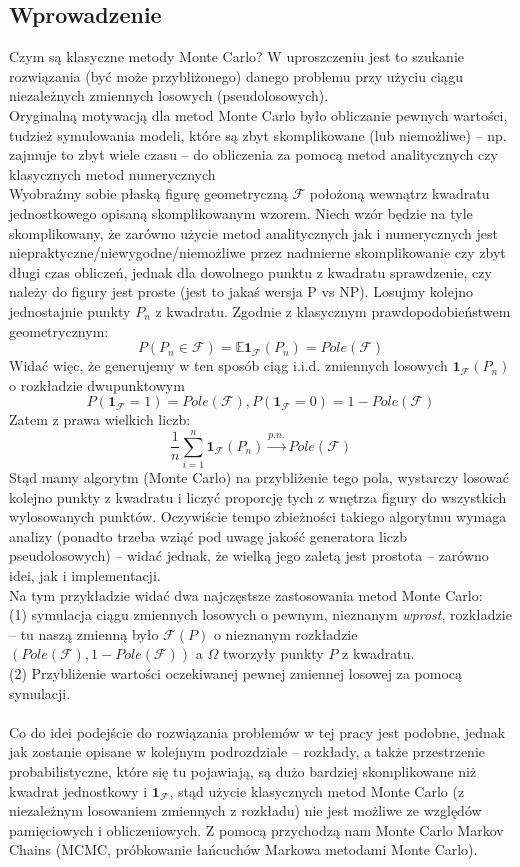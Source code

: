 \documentclass[a4paper]{article}
\begin{document}
\subsection{Wprowadzenie}
Czym są klasyczne metody Monte Carlo? W uproszczeniu jest to szukanie rozwiązania (być może przybliżonego) danego problemu przy użyciu ciągu niezależnych zmiennych losowych (pseudolosowych).\\
Oryginalną motywacją dla metod Monte Carlo było obliczanie pewnych wartości, tudzież symulowania modeli, które są zbyt skomplikowane (lub niemożliwe) – np. zajmuje to zbyt wiele czasu  – do obliczenia za pomocą metod analitycznych czy klasycznych metod numerycznych
\\Wyobraźmy sobie płaską figurę geometryczną $\mathcal{F}$ położoną wewnątrz kwadratu jednostkowego opisaną skomplikowanym wzorem.
Niech wzór będzie na tyle skomplikowany, że zarówno użycie metod analitycznych jak i numerycznych jest niepraktyczne/niewygodne/niemożliwe przez nadmierne skomplikowanie czy zbyt długi czas obliczeń, jednak dla dowolnego punktu z kwadratu sprawdzenie, czy należy do figury jest proste (jest to jakaś wersja P vs NP). Losujmy kolejno jednostajnie punkty $P_n$ z kwadratu. Zgodnie z klasycznym prawdopodobieństwem geometrycznym: $$P(P_n \in \mathcal{F}) = \mathbb{E}\mathbf{1}_{\mathcal{F}}(P_n) = Pole(\mathcal{F})$$
Widać więc, że generujemy w ten sposób ciąg i.i.d. zmiennych losowych $\mathbf{1}_{\mathcal{F}}(P_n)$ o rozkładzie dwupunktowym $$P(\mathbf{1}_{\mathcal{F}} = 1) = Pole(\mathcal{F}), P(\mathbf{1}_{\mathcal{F}} = 0) = 1 - Pole(\mathcal{F})$$
Zatem z prawa wielkich liczb:
$$\frac{1}{n} \sum\limits_{i=1}^n \mathbf{1}_{\mathcal{F}}(P_n) \overset{p.n.}{\to} Pole(\mathcal{F})$$
Stąd mamy algorytm (Monte Carlo) na przybliżenie tego pola, wystarczy losować kolejno punkty z kwadratu i liczyć proporcję tych z wnętrza figury do wszystkich wylosowanych punktów. Oczywiście tempo zbieżności takiego algorytmu wymaga analizy (ponadto trzeba wziąć pod uwagę jakość generatora liczb pseudolosowych) – widać jednak, że wielką jego zaletą jest prostota – zarówno idei, jak i implementacji.
\\
Na tym przykładzie widać dwa najczęstsze zastosowania metod Monte Carlo:\\
(1) symulacja ciągu zmiennych losowych o pewnym, nieznanym \textit{wprost}, rozkładzie – tu naszą zmienną było $\mathcal{F}(P)$ o nieznanym rozkładzie $(Pole(\mathcal{F}), 1 - Pole(\mathcal{F}))$ a $\Omega$ tworzyły punkty $P$ z kwadratu.\\
(2) Przybliżenie wartości oczekiwanej pewnej zmiennej losowej za pomocą symulacji.\\\\
Co do idei podejście do rozwiązania problemów w tej pracy jest podobne, jednak jak zostanie opisane w kolejnym podrozdziale – rozkłady, a także przestrzenie probabilistyczne, które się tu pojawiają, są dużo bardziej skomplikowane niż kwadrat jednostkowy i $\mathbf{1}_{\mathcal{F}}$, stąd użycie klasycznych metod Monte Carlo (z niezależnym losowaniem zmiennych z rozkładu) nie jest możliwe ze względów pamięciowych i obliczeniowych. Z pomocą przychodzą nam Monte Carlo Markov Chains (MCMC, próbkowanie łańcuchów Markowa metodami Monte Carlo).
\\\\
\end{document}
